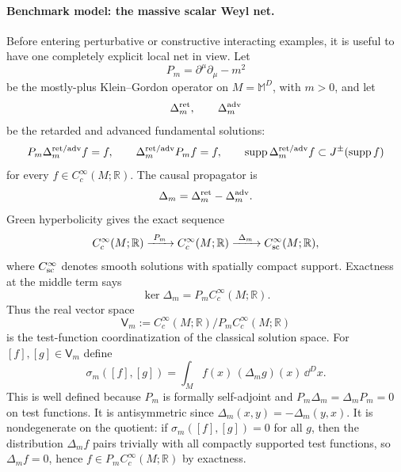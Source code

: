 \paragraph{Benchmark model: the massive scalar Weyl net.}
Before entering perturbative or constructive interacting examples, it is
useful to have one completely explicit local net in view.  Let
\[
  P_m=\partial^\mu\partial_\mu-m^2
\]
be the mostly-plus Klein--Gordon operator on \(M=\mathbb M^D\), with
\(m>0\), and let
\[
  \Delta_m^{\rm ret},\qquad \Delta_m^{\rm adv}
\]
be the retarded and advanced fundamental solutions:
\[
  P_m\Delta_m^{\rm ret/adv}f=f,\qquad
  \Delta_m^{\rm ret/adv}P_m f=f,\qquad
  \operatorname{supp}\Delta_m^{\rm ret/adv}f
  \subset J^\pm(\operatorname{supp}f)
\]
for every \(f\in C_c^\infty(M;\mathbb R)\).  The causal propagator is
\[
  \Delta_m=\Delta_m^{\rm ret}-\Delta_m^{\rm adv}.
\]
Green hyperbolicity gives the exact sequence
\[
  C_c^\infty(M;\mathbb R)
  \xrightarrow{\ P_m\ }
  C_c^\infty(M;\mathbb R)
  \xrightarrow{\ \Delta_m\ }
  C^\infty_{\rm sc}(M;\mathbb R),
\]
where \(C^\infty_{\rm sc}\) denotes smooth solutions with spatially compact
support.  Exactness at the middle term says
\[
  \ker\Delta_m=P_m C_c^\infty(M;\mathbb R).
\]
Thus the real vector space
\begin{equation}
  \mathsf V_m
  :=
  C_c^\infty(M;\mathbb R)\big/P_m C_c^\infty(M;\mathbb R)
  \label{eq:free-scalar-symplectic-test-quotient}
\end{equation}
is the test-function coordinatization of the classical solution space.  For
\([f],[g]\in\mathsf V_m\) define
\begin{equation}
  \sigma_m([f],[g])
  =
  \int_M f(x)\,(\Delta_m g)(x)\,\dd^D x .
  \label{eq:free-scalar-symplectic-form}
\end{equation}
This is well defined because \(P_m\) is formally self-adjoint and
\(P_m\Delta_m=\Delta_m P_m=0\) on test functions.  It is antisymmetric since
\(\Delta_m(x,y)=-\Delta_m(y,x)\).  It is nondegenerate on the quotient:
if \(\sigma_m([f],[g])=0\) for all \(g\), then the distribution
\(\Delta_m f\) pairs trivially with all compactly supported test functions,
so \(\Delta_m f=0\), hence \(f\in P_m C_c^\infty(M;\mathbb R)\) by exactness.

